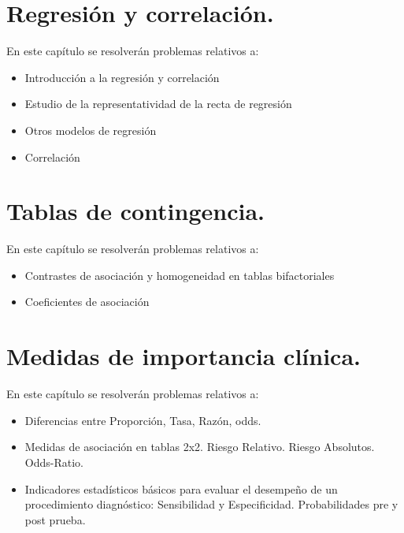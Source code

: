\documentclass[
]{book}
\providecommand{\tightlist}{%
  \setlength{\itemsep}{0pt}\setlength{\parskip}{0pt}}
\begin{document}
\hypertarget{regresiuxf3n-y-correlaciuxf3n.}{%
\chapter{Regresión y correlación.}\label{regresiuxf3n-y-correlaciuxf3n.}}

En este capítulo se resolverán problemas relativos a:

\begin{itemize}
\tightlist
\item
  Introducción a la regresión y correlación
\item
  Estudio de la representatividad de la recta de regresión
\item
  Otros modelos de regresión
\item
  Correlación
\end{itemize}

\hypertarget{tablas-de-contingencia.}{%
\chapter{Tablas de contingencia.}\label{tablas-de-contingencia.}}

En este capítulo se resolverán problemas relativos a:

\begin{itemize}
\tightlist
\item
  Contrastes de asociación y homogeneidad en tablas bifactoriales
\item
  Coeficientes de asociación
\end{itemize}

\hypertarget{medidas-de-importancia-cluxednica.}{%
\chapter{Medidas de importancia clínica.}\label{medidas-de-importancia-cluxednica.}}

En este capítulo se resolverán problemas relativos a:

\begin{itemize}
\tightlist
\item
  Diferencias entre Proporción, Tasa, Razón, odds.
\item
  Medidas de asociación en tablas 2x2. Riesgo Relativo. Riesgo Absolutos. Odds-Ratio.
\item
  Indicadores estadísticos básicos para evaluar el desempeño de un procedimiento diagnóstico: Sensibilidad y Especificidad. Probabilidades pre y post prueba.
\end{itemize}

  
\end{document}
